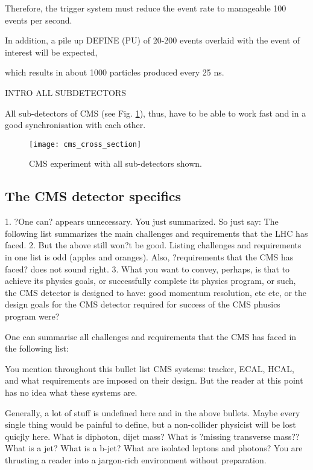  
 
  Therefore, the trigger system must reduce the event rate to manageable 100 events per second. 
  
  In addition, a pile up DEFINE (PU) of 20-200 events overlaid with the event of interest will be expected, 
  
  which results in about 1000 particles produced every 25 ns. 
  
  INTRO ALL SUBDETECTORS
  
  
  
  
  All sub-detectors of CMS (see Fig. \ref{cms_cross_section}), thus, have to be able to work fast and in a good synchronisation with each other. 


\begin{figure}[H]
  \centering
  \texttt{[image: cms\_cross\_section]}
  \caption{CMS experiment with all sub-detectors shown.}\label{cms_cross_section}
\end{figure}

\subsection{The CMS detector specifics}

1. ?One can? appears unnecessary. You just summarized. So just say: The following list summarizes the main challenges and requirements that the LHC has faced.
2. But the above still won?t be good. Listing challenges and requirements in one list is odd (apples and oranges). Also, ?requirements that the CMS has faced? does not sound right.
3. What you want to convey, perhaps, is that to achieve its physics goals, or successfully complete its physics program, or such, the CMS detector is designed to have: good momentum resolution, etc etc, or the design goals for the CMS detector required for success of the CMS phusics program were? 


One can summarise all challenges and requirements that the CMS has faced in the following list:

You mention throughout this bullet list CMS systems: tracker, ECAL, HCAL, and what requirements are imposed on their design. But the reader at this point has no idea what these systems are.

Generally, a lot of stuff is undefined here and in the above bullets. Maybe every single thing would be painful to  define, but a non-collider physicist will be lost quicjly here. 
  What is diphoton, dijet mass? 
  What is ?missing transverse mass??
  What is a jet? What is a b-jet?
   What are isolated leptons and photons?
  You are thrusting a reader into a jargon-rich environment without preparation.
 

